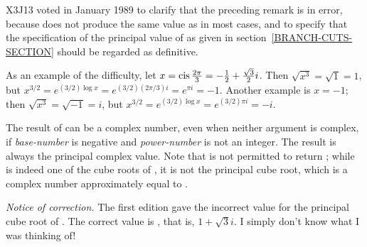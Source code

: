 \begin{defun}[Function]
\begin{new}
X3J13 voted in January 1989
to clarify that the preceding remark is in
error, because  does not produce the same value
as  in most cases, and to specify that the
specification of the principal value of  as given in section~\ref{BRANCH-CUTS-SECTION}
should be regarded as definitive.

As an example of the difficulty, let
$ x=\mathop\textrm{cis}\nolimits {2 \pi \over 3}= -{1 \over 2} + {\sqrt{3} \over 2}i $.
Then $ \sqrt{x^3} = \sqrt{1} = 1 $, but
$ x^{3 / 2} = e^{(3/2) \log {x}}
   = e^{(3/2) (2\pi/3) i} = e^{\pi i} = -1 $.
Another example is $x=-1$; then $ \sqrt{x^3} = \sqrt{-1} = i$, but
$x^{3/2} = e^{(3/2) \log {x}} = e^{(3/2) \pi i} = -i$.
\end{new}

The result of  can be a complex number, even when neither argument
is complex, if \emph{base-number} is negative and \emph{power-number}
is not an integer.  The result is always the principal complex value.
Note that  is not permitted to return ;
while  is indeed one of the cube roots of , it is
not the principal cube root, which is a complex number
approximately equal to .

\begin{new}%
\emph{Notice of correction.}  The first edition gave the incorrect value
 for the principal cube root of .  The correct
value is , that is, $1+\sqrt{3}i$.  I simply don't know what
I was thinking of!
\end{new}
\end{defun}


